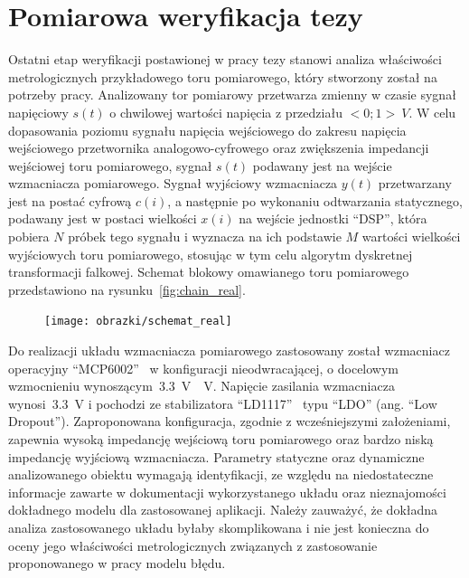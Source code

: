 \chapter{Pomiarowa weryfikacja tezy}

Ostatni etap weryfikacji postawionej w pracy tezy stanowi analiza właściwości metrologicznych przykładowego toru pomiarowego, który stworzony został na potrzeby pracy. Analizowany tor pomiarowy przetwarza zmienny w czasie sygnał napięciowy $s(t)$ o chwilowej wartości napięcia z przedziału $<0;1>~\unit{V}$. W celu dopasowania poziomu sygnału napięcia wejściowego do zakresu napięcia wejściowego przetwornika analogowo-cyfrowego oraz zwiększenia impedancji wejściowej toru pomiarowego, sygnał $s(t)$ podawany jest na wejście wzmacniacza pomiarowego. Sygnał wyjściowy wzmacniacza $y(t)$ przetwarzany jest na postać cyfrową $c(i)$, a następnie po wykonaniu odtwarzania statycznego, podawany jest w postaci wielkości $x(i)$ na wejście jednostki \enquote{DSP}, która pobiera $N$ próbek tego sygnału i wyznacza na ich podstawie $M$ wartości wielkości wyjściowych toru pomiarowego, stosując w tym celu algorytm dyskretnej transformacji falkowej. Schemat blokowy omawianego toru pomiarowego przedstawiono na rysunku~\ref{fig:chain_real}.

\begin{figure}[htb!]
\begin{center}
\texttt{[image: obrazki/schemat\_real]}
\end{center}
\end{figure}

Do realizacji układu wzmacniacza pomiarowego zastosowany został wzmacniacz operacyjny \enquote{MCP6002}~\cite{microchip_manual} w konfiguracji nieodwracającej, o docelowym wzmocnieniu wynoszącym~\qty{3.3}{V \per V}. Napięcie zasilania wzmacniacza wynosi~\qty{3.3}{V} i pochodzi ze stabilizatora \enquote{LD1117}~\cite{stm_manual} typu \enquote{LDO} (ang. \enquote{Low Dropout}). Zaproponowana konfiguracja, zgodnie z wcześniejszymi założeniami, zapewnia wysoką impedancję wejściową toru pomiarowego oraz bardzo niską impedancję wyjściową wzmacniacza. Parametry statyczne oraz dynamiczne analizowanego obiektu wymagają identyfikacji, ze względu na niedostateczne informacje zawarte w dokumentacji wykorzystanego układu oraz nieznajomości dokładnego modelu dla zastosowanej aplikacji. Należy zauważyć, że dokładna analiza zastosowanego układu byłaby skomplikowana i nie jest konieczna do oceny jego właściwości metrologicznych związanych z zastosowanie proponowanego w pracy modelu błędu.

